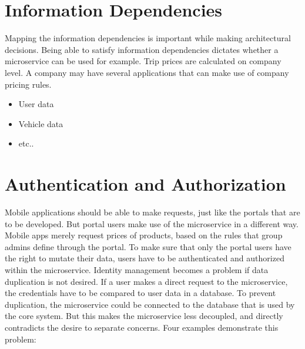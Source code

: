 %
\section{Information Dependencies}
Mapping the information dependencies is important while making architectural decisions. Being able to satisfy information dependencies dictates whether a microservice can be used for example. Trip prices are calculated on company level. A company may have several applications that can make use of company pricing rules.

\begin{itemize}
	\item User data
	\item Vehicle data
	\item etc..
\end{itemize}

%
\section{Authentication and Authorization}
Mobile applications should be able to make requests, just like the portals that are to be developed. But portal users make use of the microservice in a different way. Mobile apps merely request prices of products, based on the rules that group admins define through the portal. To make sure that only the portal users have the right to mutate their data, users have to be authenticated and authorized within the microservice. Identity management becomes a problem if data duplication is not desired. If a user makes a direct request to the microservice, the credentials have to be compared to user data in a database. To prevent duplication, the microservice could be connected to the database that is used by the core system. But this makes the microservice less decoupled, and directly contradicts the desire to separate concerns. Four examples demonstrate this problem:

